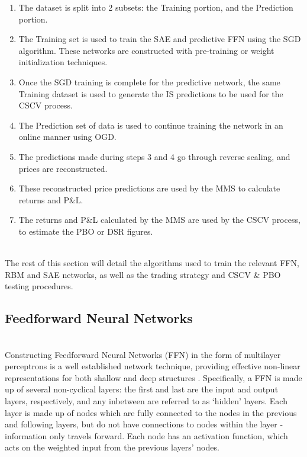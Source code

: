 \documentclass[a4paper,11pt,oneside]{article}
\theoremstyle{plain}
\theoremstyle{definition}
\begin{document}
	\begin{enumerate}
		\item The dataset is split into 2 subsets: the Training portion, and the Prediction portion.
		\item The Training set is used to train the SAE and predictive FFN using the SGD algorithm. These networks are constructed with pre-training or weight initialization techniques.
		\item Once the SGD training is complete for the predictive network, the same Training dataset is used to generate the IS predictions to be used for the CSCV process.
		\item The Prediction set of data is used to continue training the network in an online manner using OGD.
		\item The predictions made during steps 3 and 4 go through reverse scaling, and prices are reconstructed.
		\item These reconstructed price predictions are used by the MMS to calculate returns and P\&L.
		\item The returns and P\&L calculated by the MMS are used by the CSCV process, to estimate the PBO or DSR figures.
	\end{enumerate}
	~\\
	The rest of this section will detail the algorithms used to train the relevant FFN, RBM and SAE networks, as well as the trading strategy and CSCV \& PBO testing procedures.
	
	\subsection{Feedforward Neural Networks}\label{imp_ffn}
	~\\
	Constructing Feedforward Neural Networks (FFN) in the form of multilayer perceptrons is a well established network technique, providing effective non-linear representations for both shallow and deep structures \citep{Schmidhuber}. Specifically, a FFN is made up of several non-cyclical layers: the first and last are the input and output layers, respectively, and any inbetween are referred to as `hidden' layers. Each layer is made up of nodes which are fully connected to the nodes in the previous and following layers, but do not have connections to nodes within the layer - information only travels forward. Each 
	node has an activation function, which acts on the weighted input from the previous layers' nodes.
	
\end{document}
